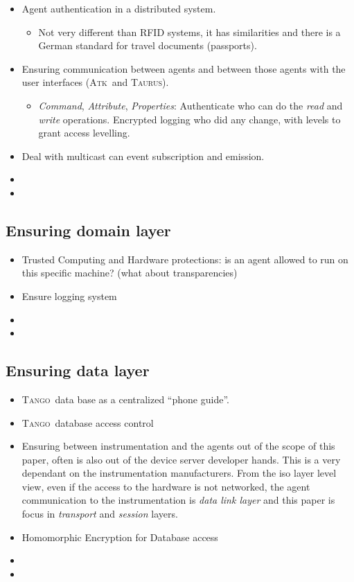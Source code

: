\documentclass[10pt,a4paper,twoside]{llncs}
\newcommand{\tango}{\textsc{Tango}}
\newcommand{\taurus}{\textsc{Taurus}}
\newcommand{\atk}{\textsc{Atk}}
\begin{document}
\begin{itemize}
    \item Agent authentication in a distributed system.
    \begin{itemize}
     \item Not very different than RFID systems, it has similarities and there is a German standard \cite{BSI_TR-03110} for travel documents (passports).
    \end{itemize}
    \item Ensuring communication between agents and between those agents with the user interfaces (\atk\, and \taurus).
    \begin{itemize}
        \item \emph{Command}, \emph{Attribute}, \emph{Properties}: Authenticate who can do the \emph{read} and \emph{write} operations. Encrypted logging who did any change, with levels to grant access levelling.
    \end{itemize}
    \item Deal with multicast can event subscription and emission.
    \item 
    \item 
\end{itemize}

%
\subsection{Ensuring domain layer \label{sec:domainLayer}}

\begin{itemize}
    \item Trusted Computing and Hardware protections: is an agent allowed to run on this specific machine? (what about transparencies)
    \item Ensure logging system
    \item 
    \item
\end{itemize}

%
\subsection{Ensuring data layer \label{sec:dataLayer}}

\begin{itemize}
    \item \tango\, data base as a centralized ``phone guide''.
    \item \tango\, database access control
    \item Ensuring between instrumentation and the agents out of the scope of this paper, often is also out of the device server developer hands. This is a very dependant on the instrumentation manufacturers. From the iso layer level view, even if the access to the hardware is not networked, the agent communication to the instrumentation is \emph{data link layer} and this paper is focus in \emph{transport} and \emph{session} layers.
    \item Homomorphic Encryption for Database access
    \item  
    \item 
\end{itemize}
\end{document}
